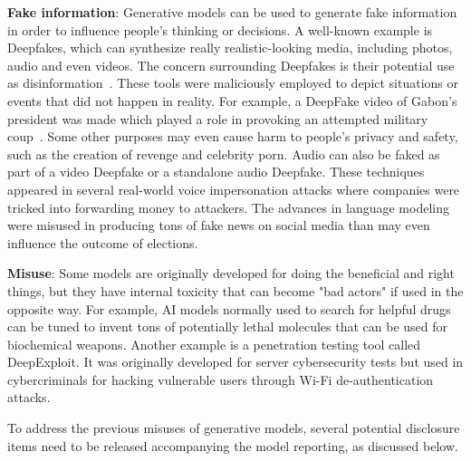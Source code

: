 \documentclass[conference]{IEEEtran}
\begin{document}
\textbf{Fake information}:
Generative models can be used to generate fake information in order to influence people's thinking or decisions. 
A well-known example is Deepfakes, which can synthesize really realistic-looking media, including photos, audio and even videos. 
The concern surrounding Deepfakes is their potential use as disinformation~\cite{b5}.
These tools were maliciously employed to depict situations or events that did not happen in reality. 
For example, a DeepFake video of Gabon's president was made which played a role in provoking an attempted military coup~\cite{b6}. 
Some other purposes may even cause harm to people's privacy and safety, such as the creation of revenge and celebrity porn. 
Audio can also be faked as part of a video Deepfake or a standalone audio Deepfake. 
These techniques appeared in several real-world voice impersonation attacks where companies were tricked into forwarding money to attackers.
The advances in language modeling were misused in producing tons of fake news on social media than may even influence the outcome of elections\cite{b8}. 

\textbf{Misuse}:
Some models are originally developed for doing the beneficial and right things, but they have internal toxicity that can become "bad actors" if used in the opposite way. 
For example, AI models normally used to search for helpful drugs can be tuned to invent tons of potentially lethal molecules that can be used for biochemical weapons\cite{b9}. 
Another example is a penetration testing tool called DeepExploit. It was originally developed for server cybersecurity tests but used in cybercriminals for hacking vulnerable users through Wi-Fi de-authentication attacks\cite{b10}.

To address the previous misuses of generative models, several potential disclosure items need to be released accompanying the model reporting, as discussed below.
\end{document}
